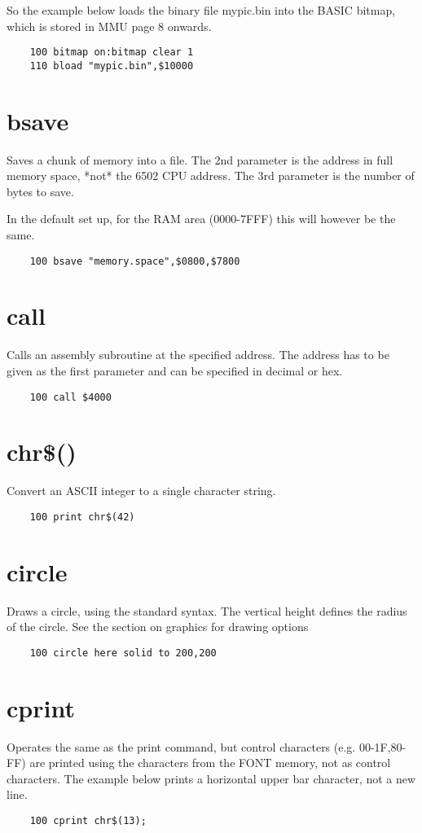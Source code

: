 So the example below loads the binary file mypic.bin into the BASIC bitmap, which is stored in MMU page 8 onwards.
\example{}
\begin{verbatim}
	100 bitmap on:bitmap clear 1
	110 bload "mypic.bin",$10000
\end{verbatim}

\section*{bsave}
Saves a chunk of memory into a file. The 2nd parameter is the address in full memory space, *not* the 6502 CPU address. The 3rd parameter is the number of bytes to save.

In the default set up, for the RAM area (0000-7FFF) this will however be the same.

\example{}
\begin{verbatim}
	100 bsave "memory.space",$0800,$7800
\end{verbatim}

\section*{call}
Calls an assembly subroutine at the specified address. The address has to be given as the first parameter and can be specified in decimal or hex.

\example{}
\begin{verbatim}
	100 call $4000
\end{verbatim}

\section*{chr\$()}
Convert an ASCII integer to a single character string.
\example{}
\begin{verbatim}
	100 print chr$(42)
\end{verbatim}

\section*{circle}
Draws a circle, using the standard syntax. The vertical height defines the radius of the circle. See the section on graphics for drawing options
\example{}
\begin{verbatim}
	100 circle here solid to 200,200
\end{verbatim}

\section*{cprint}
Operates the same as the print command, but control characters (e.g. 00-1F,80-FF) are printed using the characters from the FONT memory, not as control characters. The example below prints a horizontal upper bar character, not a new line.
\example{}
\begin{verbatim}
	100 cprint chr$(13);
\end{verbatim}

